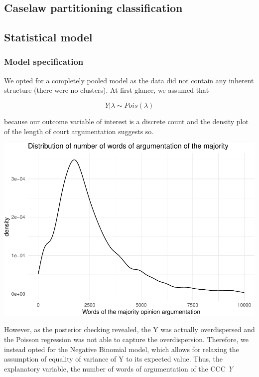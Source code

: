 \documentclass[
  11pt,
]{article}
\begin{document}
\hypertarget{caselaw-partitioning-classification}{%
\subsection{Caselaw partitioning
classification}\label{caselaw-partitioning-classification}}

\hypertarget{statistical-model}{%
\subsection{Statistical model}\label{statistical-model}}

\hypertarget{model-specification}{%
\subsubsection{Model specification}\label{model-specification}}

We opted for a completely pooled model as the data did not contain any
inherent structure (there were no clusters). At first glance, we assumed
that

\[
Y | \lambda \sim Pois(\lambda)
\]

because our outcome variable of interest is a discrete count and the
density plot of the length of court argumentation suggests so.

\includegraphics{dissents_article_appendix_files/figure-latex/negbinom-1.pdf}

However, as the posterior checking revealed, the Y was actually
overdispersed and the Poisson regression was not able to capture the
overdispersion. Therefore, we instead opted for the Negative Binomial
model, which allows for relaxing the assumption of equality of variance
of Y to its expected value. Thus, the explanatory variable, the number
of words of argumentation of the CCC \emph{Y}
\end{document}
